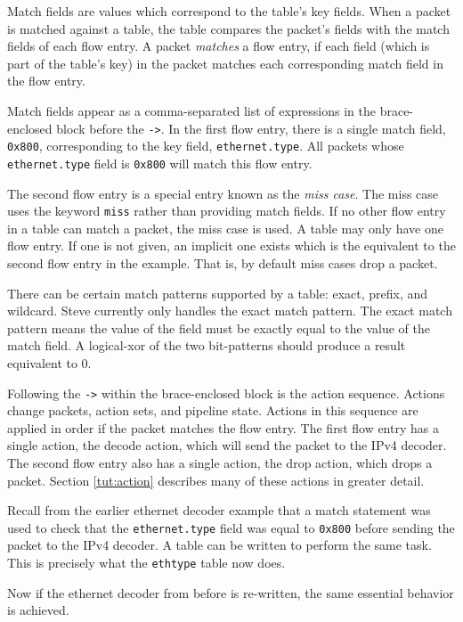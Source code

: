 Match fields are values which
correspond to the table's key fields. When a packet is matched against a table,
the table compares the packet's fields with the match fields of each flow entry.
A packet \textit{matches} a flow entry, if each field (which is part of the
table's key) in the packet matches each corresponding match field in the flow entry. 

Match
fields appear as a comma-separated list of expressions in the brace-enclosed
block before the \texttt{->}. In the first flow entry, there is a single match field,
\texttt{0x800}, corresponding to the key field, \texttt{ethernet.type}.
All packets whose \texttt{ethernet.type} field is \texttt{0x800} will match
this flow entry. 

The second flow entry is a special entry known as the \textit{miss case}. The miss case uses the keyword \texttt{miss} rather than providing match fields. If no other flow entry in a table can match a packet, the miss case is used. A table may only have one flow entry. If one is not given, an implicit one exists which is the equivalent to the second flow entry in the example. That is, by default miss cases drop a packet.

There can be certain match patterns supported by a table: exact, prefix, and wildcard. Steve currently only handles the exact match pattern. The exact match pattern means the value of the field must be exactly equal to the value of the match field. A logical-xor of the two bit-patterns should produce a result equivalent to 0.

Following the \texttt{->} within the brace-enclosed block is
the action sequence. Actions change packets, action sets, and pipeline state.
Actions in this sequence are applied in
order if the packet matches the flow entry. The first flow entry has a single action, the decode action, which
will send the packet to the IPv4 decoder. The second flow entry also has a single action, the drop action, which drops a packet. Section \ref{tut:action}
describes many of these actions in greater detail.

Recall from the earlier ethernet decoder example that a match statement was used to check that the \texttt{ethernet.type} field was equal to \texttt{0x800} before sending the packet to the IPv4 decoder. A table can be written to perform the same task. This is precisely what the \texttt{ethtype} table now does.

Now if the ethernet decoder from before is re-written, the same essential behavior is achieved.

